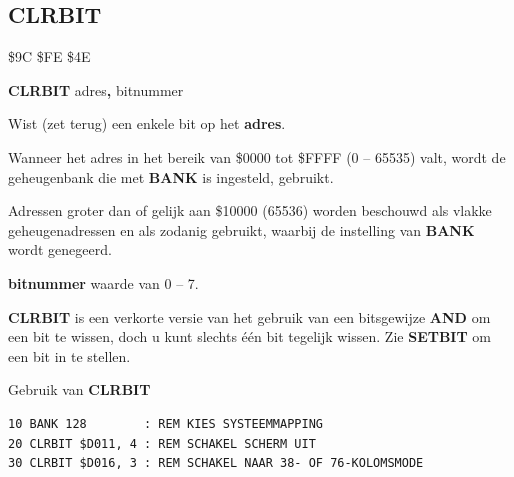 \subsection{CLRBIT}
\begin{description}[leftmargin=2cm,style=nextline]
\item [Token:]   \$9C \$FE \$4E

\item [Formaat:]  {\bf CLRBIT} adres{\bf,} bitnummer

\item [Gebruik:]   Wist (zet terug) een enkele bit op het {\bf adres}.

                 Wanneer het adres in het bereik van \$0000 tot \$FFFF (0 -- 65535) valt, wordt de geheugenbank die met {\bf BANK} is ingesteld, gebruikt.

                 Adressen groter dan of gelijk aan \$10000 (65536) worden beschouwd als vlakke geheugenadressen en als zodanig gebruikt, waarbij de instelling van {\bf BANK} wordt genegeerd.

                 {\bf bitnummer} waarde van 0 -- 7.

\item [Opmerkingen:] {\bf CLRBIT} is een verkorte versie van het gebruik van een bitsgewijze {\bf AND} om een bit te wissen, doch u kunt slechts één bit tegelijk wissen. Zie {\bf SETBIT} om een bit in te stellen.

\item [Voorbeeld:] Gebruik van {\bf CLRBIT}

\begin{tcolorbox}[colback=black,coltext=white]
\verbatimfont{\codefont}
\begin{verbatim}
10 BANK 128        : REM KIES SYSTEEMMAPPING
20 CLRBIT $D011, 4 : REM SCHAKEL SCHERM UIT
30 CLRBIT $D016, 3 : REM SCHAKEL NAAR 38- OF 76-KOLOMSMODE
\end{verbatim}
\end{tcolorbox}
\end{description}


\newpage
